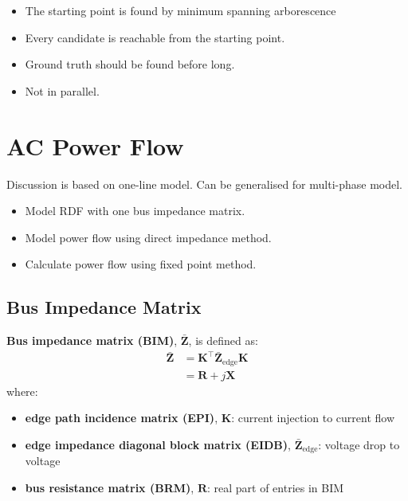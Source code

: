 \documentclass[
]{book}
\providecommand{\tightlist}{%
  \setlength{\itemsep}{0pt}\setlength{\parskip}{0pt}}
\begin{document}
\begin{itemize}
\tightlist
\item
  The starting point is found by minimum spanning arborescence
\item
  Every candidate is reachable from the starting point.
\item
  Ground truth should be found before long.
\item
  Not in parallel.
\end{itemize}

\hypertarget{AC}{%
\chapter{AC Power Flow}\label{AC}}

Discussion is based on one-line model. Can be generalised for multi-phase
model.

\begin{itemize}
\tightlist
\item
  Model RDF with one bus impedance matrix.
\item
  Model power flow using direct impedance method.
\item
  Calculate power flow using fixed point method.
\end{itemize}

\hypertarget{BIM}{%
\section{Bus Impedance Matrix}\label{BIM}}

\textbf{Bus impedance matrix (BIM)}, \(\boldsymbol{\bar{Z}}\), is defined as:
\[ \begin{aligned}
  \boldsymbol{\bar{Z}}
    &= \boldsymbol{K}^{\top} \boldsymbol{\bar{Z}}_\text{edge}
    \boldsymbol{K} \\
    &= \boldsymbol{R} + j \boldsymbol{X}
\end{aligned} \]
where:

\begin{itemize}
\tightlist
\item
  \textbf{edge path incidence matrix (EPI)}, \(\boldsymbol{K}\): current injection to
  current flow
\item
  \textbf{edge impedance diagonal block matrix (EIDB)},
  \(\boldsymbol{\bar{Z}}_\text{edge}\): voltage drop to voltage
\item
  \textbf{bus resistance matrix (BRM)}, \(\boldsymbol{R}\): real part of entries in
  BIM
\end{itemize}
\end{document}
